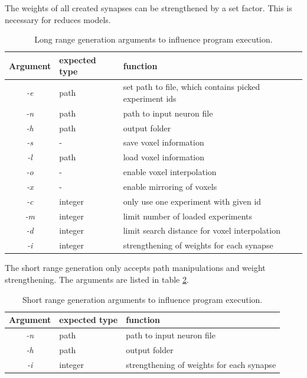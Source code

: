 The weights of all created synapses can be strengthened by a set factor.
This is necessary for reduces models.
\begin{table}[ht!]
\begin{centering}
    \begin{tabular}{ | c | l | p{7cm} |}
    \hline
    Argument & expected type & function \\ \hline \hline
    \emph{-e} & path & set path to file, which contains picked experiment ids \\ \hline
    \emph{-n} & path & path to input neuron file \\ \hline
    \emph{-h} & path &  output folder\\ \hline
    \emph{-s} & - &  save voxel information\\ \hline
    \emph{-l} & path &  load voxel information\\ \hline
    \emph{-o} & - &  enable voxel interpolation\\ \hline
    \emph{-x} & - &  enable mirroring of voxels\\ \hline
    \emph{-c} & integer & only use one experiment with given id \\ \hline
    \emph{-m} & integer & limit number of loaded experiments \\ \hline
    \emph{-d} & integer & limit search distance for voxel interpolation \\ \hline
    \emph{-i} & integer & strengthening of weights for each synapse \\ \hline
    \end{tabular}
    \caption{Long range generation arguments to influence program execution.}
    \label{tab:longrangeargs}
\end{centering}
\end{table}

The short range generation only accepts path manipulations and weight strengthening.
The arguments are listed in table \ref{tab:shortrangeargs}.
\begin{table}[ht!]
\begin{centering}
    \begin{tabular}{ | c | l | p{7cm} |}
    \hline
    Argument & expected type & function \\ \hline \hline
    \emph{-n} & path & path to input neuron file \\ \hline
    \emph{-h} & path &  output folder\\ \hline
    \emph{-i} & integer & strengthening of weights for each synapse \\ \hline
    \end{tabular}
    \caption{Short range generation arguments to influence program execution.}
    \label{tab:shortrangeargs}
\end{centering}
\end{table}


